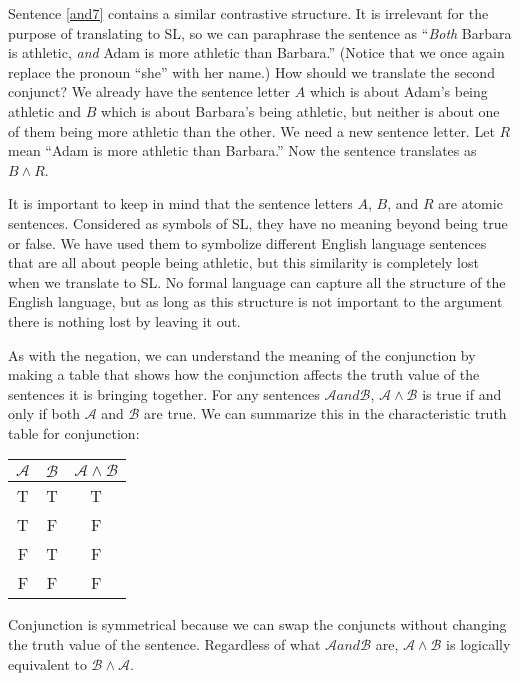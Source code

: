 Sentence \ref{and7} contains a similar contrastive structure. It is irrelevant for the purpose of translating to SL, so we can paraphrase the sentence as ``\emph{Both} Barbara is athletic, \emph{and} Adam is more athletic than Barbara.'' (Notice that we once again replace the pronoun ``she'' with her name.) How should we translate the second conjunct? We already have the sentence letter $A$ which is about Adam's being athletic and $B$ which is about Barbara's being athletic, but neither is about one of them being more athletic than the other. We need a new sentence letter. Let $R$ mean ``Adam is more athletic than Barbara.'' Now the sentence translates as $B \land R$.

It is important to keep in mind that the sentence letters $A$, $B$, and $R$ are atomic sentences. Considered as symbols of SL, they have no meaning beyond being true or false. We have used them to symbolize different English language sentences that are all about people being athletic, but this similarity is completely lost when we translate to SL. No formal language can capture all the structure of the English language, but as long as this structure is not important to the argument there is nothing lost by leaving it out.

As with the negation, we can understand the meaning of the conjunction by making a table that shows how the conjunction affects the truth value of the  sentences it is bringing together.
For any sentences $\mathcal{A} and \mathcal{B}$, $\mathcal{A} \land \mathcal{B}$ is true if and only if both $\mathcal{A}$ and $\mathcal{B}$ are true. We can summarize this in the {characteristic truth table} for conjunction:

\begin{table}
\begin{tabular}{c|c|c}
$\mathcal{A}$ & $\mathcal{B}$ & $\mathcal{A} \land \mathcal{B}$\\
\hline
T & T & T\\
T & F & F\\
F & T & F\\
F & F & F
\end{tabular}
\end{table}

Conjunction is symmetrical because we can swap the conjuncts without changing the truth value of the sentence. Regardless of what $\mathcal{A} and \mathcal{B}$ are, $\mathcal{A}\land\mathcal{B}$ is logically equivalent to $\mathcal{B} \land \mathcal{A}$.


